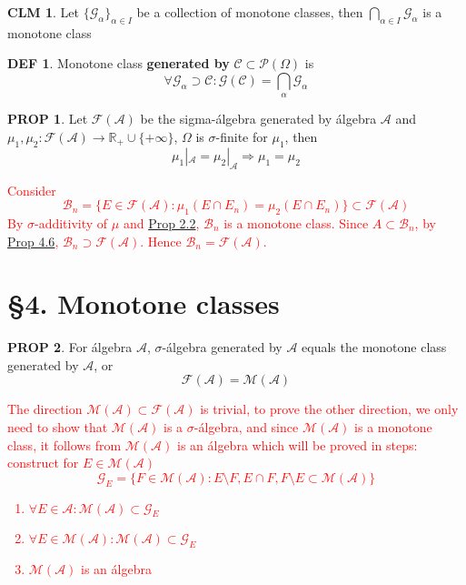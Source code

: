 \documentclass[hidelinks]{article}
\theoremstyle{definition}
\newtheorem*{defin}{DEF}
\theoremstyle{dotless}
\newtheorem{proposition}{PROP}[section]
\newtheorem{claim}{CLM}[section]
\theoremstyle{remark}
\begin{document}
\begin{claim}
Let $\{\mathscr{G}_\alpha\}_{\alpha\in I}$ be a collection of monotone classes, then $\bigcap\limits_{\alpha\in I}\mathscr{G}_\alpha$ is a monotone class
\end{claim}

\begin{defin}
Monotone class \textbf{generated by} $\mathscr{C}\subset\mathscr{P}(\Omega)$ is \[\forall\mathscr{G}_\alpha\supset\mathscr{C}:\mathscr{G}(\mathscr{C})=\bigcap\limits_\alpha\mathscr{G}_\alpha\]
\end{defin}

\begin{proposition}\label{Prop 3.5}
Let $\mathscr{F}(\mathscr{A})$ be the sigma-álgebra generated by álgebra $\mathscr{A}$ and $\mu_1,\mu_2:\mathscr{F}(\mathscr{A})\to\mathbb{R}_+\cup\{+\infty\}$, $\Omega$ is $\sigma$-finite for $\mu_1$, then
\[\mu_1|_\mathscr{A}=\mu_2|_\mathscr{A}\Rightarrow\mu_1=\mu_2\]
\end{proposition}
\textcolor{red}{Consider
\[\mathscr{B}_n=\{E\in\mathscr{F}(\mathscr{A}):\mu_1(E\cap E_n)=\mu_2(E\cap E_n)\}\subset\mathscr{F}(\mathscr{A})\]
By $\sigma$-additivity of $\mu$ and \hyperref[Prop 2.2]{Prop 2.2}, $\mathscr{B}_n$ is a monotone class. Since $A\subset\mathscr{B}_n$, by \hyperref[Prop 4.6]{Prop 4.6}, $\mathscr{B}_n\supset\mathscr{F}(\mathscr{A})$. Hence $\mathscr{B}_n=\mathscr{F}(\mathscr{A})$.}

\bigbreak

\section*{\S4. Monotone classes}
\setcounter{section}{4}

\begin{proposition}\label{Prop 4.6}
For álgebra $\mathscr{A}$, $\sigma$-álgebra generated by $\mathscr{A}$ equals the monotone class generated by $\mathscr{A}$, or \[\mathscr{F}(\mathscr{A})=\mathscr{M}(\mathscr{A})\]
\end{proposition}
\textcolor{red}{The direction $\mathscr{M}(\mathscr{A})\subset\mathscr{F}(\mathscr{A})$ is trivial, to prove the other direction, we only need to show that $\mathscr{M}(\mathscr{A})$ is a $\sigma$-álgebra, and since $\mathscr{M}(\mathscr{A})$ is a monotone class, it follows from $\mathscr{M}(\mathscr{A})$ is an álgebra which will be proved in steps: construct for $E\in\mathscr{M}(\mathscr{A})$
\[\mathscr{G}_E=\{F\in\mathscr{M}(\mathscr{A}):E\setminus F,E\cap F,F\setminus E\subset\mathscr{M}(\mathscr{A})\}\]
\begin{enumerate}[label=\arabic*\degree]
    \item $\forall E\in\mathscr{A}:\mathscr{M}(\mathscr{A})\subset\mathscr{G}_E$
    \item $\forall E\in\mathscr{M}(\mathscr{A}):\mathscr{M}(\mathscr{A})\subset\mathscr{G}_E$
    \item $\mathscr{M}(\mathscr{A})$ is an álgebra
\end{enumerate}}
\end{document}

